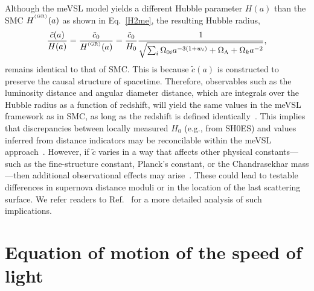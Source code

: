 \documentclass[jkps,preprint,fleqn]{revtex4} %
\newcommand{\tc}{\tilde{c}}
\newcommand{\GR}{\text{GR}}
\begin{document}
Although the meVSL model yields a different Hubble parameter $H(a)$ than the SMC $H^{\textsuperscript{\tiny (\GR)}}(a)$ as shown in Eq.~\eqref{H2me}, the resulting Hubble radius,
\begin{equation}
    \frac{\tilde{c}(a)}{H(a)}  = \frac{\tc_0}{H^{\textsuperscript{\tiny (\GR)}}(a)} = \frac{\tilde{c}_0}{H_0} \frac{1}{\sqrt{\sum_i \Omega_{0i} a^{-3(1+w_i)} + \Omega_\Lambda + \Omega_k a^{-2}}},
\end{equation}
remains identical to that of SMC. This is because $\tilde{c}(a)$ is constructed to preserve the causal structure of spacetime. Therefore, observables such as the luminosity distance and angular diameter distance, which are integrals over the Hubble radius as a function of redshift, will yield the same values in the meVSL framework as in SMC, as long as the redshift is defined identically~\cite{Lee:2020zts}. This implies that discrepancies between locally measured $H_0$ (e.g., from SH0ES) and values inferred from distance indicators may be reconcilable within the meVSL approach~\cite{Lee:2024nya}. However, if $\tilde{c}$ varies in a way that affects other physical constants—such as the fine-structure constant, Planck's constant, or the Chandrasekhar mass—then additional observational effects may arise~\cite{Lee:2020zts,Lee:2021xwh}. These could lead to testable differences in supernova distance moduli or in the location of the last scattering surface. We refer readers to Ref.~\cite{Lee:2020zts} for a more detailed analysis of such implications.

\section{Equation of motion of the speed of light}
\label{sec:sol}
\end{document}
